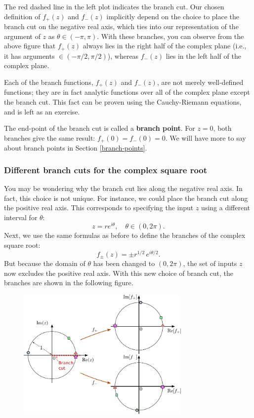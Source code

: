 \documentclass[10pt,a4paper]{article}
\begin{document}
The red dashed line in the left plot indicates the branch cut. Our
chosen definition of $f_+(z)$ and $f_-(z)$ implicitly depend on the
choice to place the branch cut on the negative real axis, which ties
into our representation of the argument of $z$ as $\theta \in
(-\pi,\pi)$.  With these branches, you can observe from the above
figure that $f_+(z)$ always lies in the right half of the complex
plane (i.e., it has arguments $\in (-\pi/2, \pi/2)$), whereas $f_-(z)$
lies in the left half of the complex plane.

Each of the branch functions, $f_+(z)$ and $f_-(z)$, are not merely
well-defined functions; they are in fact analytic functions over all
of the complex plane except the branch cut. This fact can be proven
using the Cauchy-Riemann equations, and is left as an exercise.

The end-point of the branch cut is called a \textbf{branch point}.
For $z = 0$, both branches give the same result: $f_+(0) = f_-(0) =
0$. We will have more to say about branch points in Section
\ref{branch-points}.

\subsubsection{Different branch cuts for the complex square root}
\label{different-branch-cuts-for-the-complex-square-root}

You may be wondering why the branch cut lies along the negative real
axis. In fact, this choice is not unique. For instance, we could place
the branch cut along the positive real axis. This corresponds to
specifying the input $z$ using a different interval for $\theta$:
\begin{equation}
z = re^{i\theta}, \quad \theta \in (0, 2\pi).
\end{equation}
Next, we use the same formulas as before to define the branches of the
complex square root:
\begin{equation}
f_\pm(z) = \pm r^{1/2} \, e^{i\theta/2}.
\end{equation}
But because the domain of $\theta$ has been changed to $(0, 2\pi)$,
the set of inputs $z$ now excludes the positive real axis. With this
new choice of branch cut, the branches are shown in the following
figure.

\begin{figure}[h]
  \centering\includegraphics[width=0.75\textwidth]{complex_root_2}
\end{figure}
\end{document}
